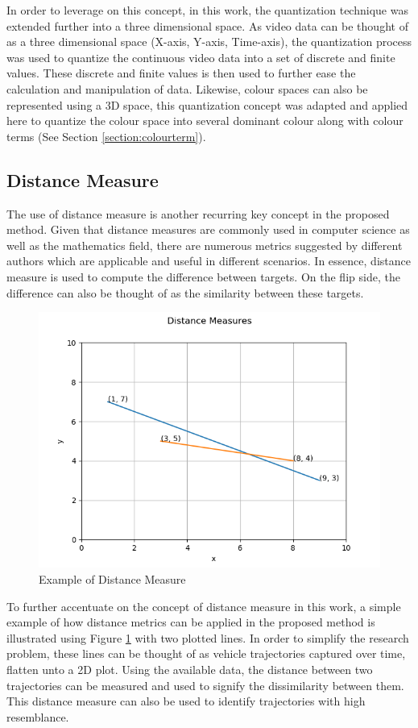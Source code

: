 In order to leverage on this concept, in this work, the quantization technique was extended further into a three dimensional space. As video data can be thought of as a three dimensional space (X-axis, Y-axis, Time-axis), the quantization process was used to quantize the continuous video data into a set of discrete and finite values. These discrete and finite values is then used to further ease the calculation and manipulation of data. Likewise, colour spaces can also be represented using a 3D space, this quantization concept was adapted and applied here to quantize the colour space into several dominant colour along with colour terms (See Section \ref{section:colourterm}).



\subsection{Distance Measure}
\label{section:distancemeasures}

The use of distance measure is another recurring key concept in the proposed method. Given that distance measures are commonly used in computer science as well as the mathematics field, there are numerous metrics suggested by different authors which are applicable and useful in different scenarios. In essence, distance measure is used to compute the difference between targets. On the flip side, the difference can also be thought of as the similarity between these targets.

\begin{figure}[hbt!]\centering
\includegraphics[width=.7\textwidth]{image/general/distance.png}
\caption{Example of Distance Measure}
\label{fig:distanceMeasure}
\end{figure}

To further accentuate on the concept of distance measure in this work, a simple example of how distance metrics can be applied in the proposed method is illustrated using Figure \ref{fig:distanceMeasure} with two plotted lines. In order to simplify the research problem, these lines can be thought of as vehicle trajectories captured over time, flatten unto a 2D plot. Using the available data, the distance between two trajectories can be measured and used to signify the dissimilarity between them. This distance measure can also be used to identify trajectories with high resemblance.


